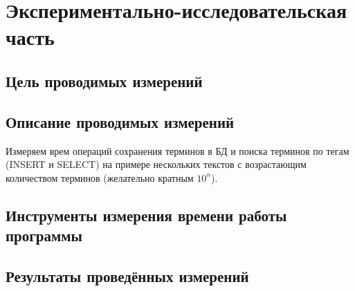 \section{Экспериментально-исследовательская часть}

\subsection{Цель проводимых измерений}
	
\subsection{Описание проводимых измерений}

Измеряем врем операций сохранения терминов в БД и поиска терминов по тегам (INSERT и SELECT) на примере нескольких текстов с возрастающим количеством терминов (желательно кратным $10^n$).
	
\subsection{Инструменты измерения времени работы программы}
		
\subsection{Результаты проведённых измерений}

\pagebreak